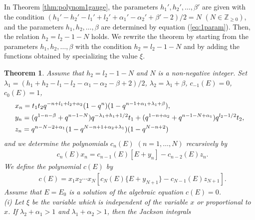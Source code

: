 \documentclass[12pt]{amsart}
\numberwithin{equation}{section}
\newtheorem{thm}{Theorem}[section]
\theoremstyle{definition}
\theoremstyle{remark}
\begin{document}
In Theorem \ref{thm:polynom1gauge}, the parameters $h_{1}' ,h_{2}', \dots ,\beta' $ are given with the condition $( h_{1}' - h_{2}' -l_{1}' + l_{2}' + \alpha_{1}' - \alpha_{2}' + \beta' - 2)/2 =N$ $(N \in {\mathbb Z}_{\geq 0})$, and the parameters $h_{1} ,h_{2}, \dots ,\beta $ are determined by equation (\ref{eq:1param}).
Then, the relation $h_{2} = l_{2} - 1 - N $ holds.
We rewrite the theorem by starting from the parameters $h_{1} ,h_{2}, \dots ,\beta $ with the condition $h_{2} = l_{2} - 1 - N $ and by adding the functions obtained by specializing the value $\xi $.
\begin{thm} \label{thm:1sols}
Assume that $h_{2} = l_{2} - 1 - N$ and $N$ is a non-negative integer.
Set  $\lambda_{1} = (h_{1} + h_{2} - l_{1} - l_{2} - \alpha_{1} - \alpha_{2} - \beta + 2)/2$, $\lambda_{2} = \lambda_{1} + \beta $,  $c_{-1}(E)=0 $,  $c_0(E)=1 $,
\begin{align*}
 & x_n = t_{1}t_{2}q^{ -n  + l_1 + l_{2} + \alpha_{2} } (1 - q^{n})(1 - q^{n -1 + \alpha _1 + \lambda _1 + \beta }) , \\
 & y_n = ( q^{1 - n  - \beta }  + q^{n - 1 -N } )q^{-\lambda _1 +h_{1} +1/2 }t_{1} + ( q^{1- n + \alpha_{2} } + q^{n -1 -N+ \alpha _1 } ) q^{l_{2} -1/2} t_{2} , \notag \\ 
 & z_n =  q^{ n -N - 2  + \alpha_{1}   } (1 - q^{N - n +1 + \alpha_{2} + \lambda _1 })(1 - q^{N -n + 2 }) \notag
\end{align*}
and we determine the polynomials $c_n(E)$ $(n=1,\dots ,N)$ recursively by
\begin{align}
 & c_{n} (E) x_n = c_{n - 1} (E) [E + y_n ] -c_{n-2} (E) z_n .  \label{eq:1cnE}
\end{align}
We define the polynomial $c (E)$ by
\begin{align}
 & c (E) = x_1 x_2 \cdots x_{N} [ c_{N} (E) \{ E + y_{N+1} \} -c_{N-1} (E) z_{N+1} ] . \label{eq:1cE}
\end{align}
Assume that $E=E_0$ is a solution of the algebraic equation $c (E)=0 $.
\\
(i) Let $\xi $ be the variable which is independent of the variable $x$ or proportional to $x$.
If $\lambda _{2} + \alpha _{1} >1 $ and  $ \lambda _{1} + \alpha _{2}  > 1$,  then the Jackson integrals
    \begin{align}

\end{align}
\end{thm}
\end{document}
